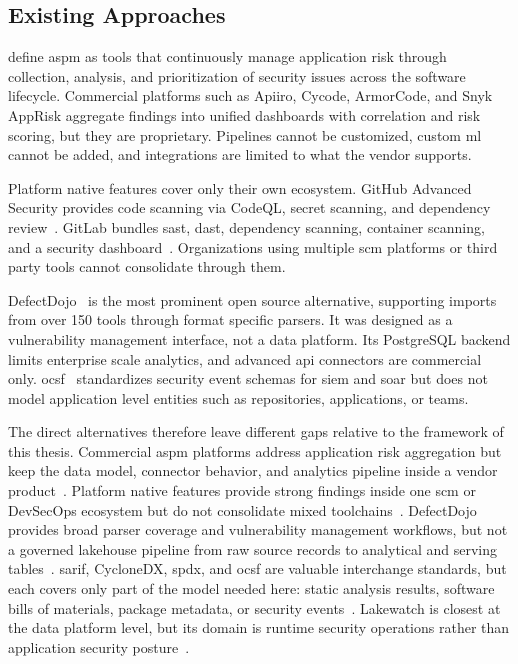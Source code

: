 
\subsection{Existing Approaches}

\textcite{Gartner2023ASPM} define \gls{aspm} as tools that continuously manage application risk through collection, analysis, and prioritization of security issues across the software lifecycle. Commercial platforms such as Apiiro, Cycode, ArmorCode, and Snyk AppRisk aggregate findings into unified dashboards with correlation and risk scoring, but they are proprietary. Pipelines cannot be customized, custom \gls{ml} cannot be added, and integrations are limited to what the vendor supports.

Platform native features cover only their own ecosystem. GitHub Advanced Security provides code scanning via CodeQL, secret scanning, and dependency review~\cite{GitHubGHAS2025}. GitLab bundles \gls{sast}, \gls{dast}, dependency scanning, container scanning, and a security dashboard~\cite{GitLabSecurity2025}. Organizations using multiple \gls{scm} platforms or third party tools cannot consolidate through them.

DefectDojo~\cite{DefectDojo2024} is the most prominent open source alternative, supporting imports from over 150 tools through format specific parsers. It was designed as a vulnerability management interface, not a data platform. Its PostgreSQL backend limits enterprise scale analytics, and advanced \gls{api} connectors are commercial only. \Gls{ocsf}~\cite{OCSF2024} standardizes security event schemas for \gls{siem} and \gls{soar} but does not model application level entities such as repositories, applications, or teams.

The direct alternatives therefore leave different gaps relative to the framework of this thesis. Commercial \gls{aspm} platforms address application risk aggregation but keep the data model, connector behavior, and analytics pipeline inside a vendor product~\cite{Gartner2023ASPM}. Platform native features provide strong findings inside one \gls{scm} or DevSecOps ecosystem but do not consolidate mixed toolchains~\cite{GitHubGHAS2025, GitLabSecurity2025}. DefectDojo provides broad parser coverage and vulnerability management workflows, but not a governed lakehouse pipeline from raw source records to analytical and serving tables~\cite{DefectDojo2024}. \Gls{sarif}, CycloneDX, \gls{spdx}, and \gls{ocsf} are valuable interchange standards, but each covers only part of the model needed here: static analysis results, software bills of materials, package metadata, or security events~\cite{OASIS2024, CycloneDX2024, SPDX2024, OCSF2024}. Lakewatch is closest at the data platform level, but its domain is runtime security operations rather than application security posture~\cite{Databricks2026Lakewatch}.

